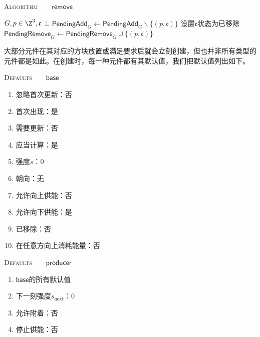 \documentclass[a4,11pt]{aleph-notas}
\begin{document}
\begin{codigo}
\textsc{Algorithm}\ \ \ \ $\mathsf{remove}$
\begin{algorithmic}[1]
    \Require $G,p\in\Z^3,\mathfrak{c}$
    \Ensure $\bot$
        \State $\textsf{PendingAdd}_G\gets\textsf{PendingAdd}_G\backslash\{(p,\mathfrak{c})\}$
    \EndIf
    \State 设置$\mathfrak{c}$状态为已移除
    \State $\textsf{PendingRemove}_G\gets\textsf{PendingRemove}_G\cup\{(p,\mathfrak{c})\}$
    \State \Return
\end{algorithmic}
\end{codigo}

大部分元件在其对应的方块放置或满足要求后就会立刻创建，但也并非所有类型的元件都是如此。在创建时，每一种元件都有其默认值，我们把默认值列出如下。

\begin{codigo}
\textsc{Defaults}\ \ \ \ $\mathsf{base}$
\begin{enumerate}
  \setlength{\itemsep}{1pt}
  \setlength{\parskip}{0pt}
  \setlength{\parsep}{0pt}
    \item 忽略首次更新：否
    \item 首次出现：是
    \item 需要更新：否
    \item 应当计算：是
    \item 强度$s$：$0$
    \item 朝向：无
    \item 允许向上供能：否
    \item 允许向下供能：是
    \item 已移除：否
    \item 在任意方向上消耗能量：否
\end{enumerate}
\end{codigo}

\begin{codigo}
\textsc{Defaults}\ \ \ \ $\mathsf{producer}$
\begin{enumerate}
  \setlength{\itemsep}{1pt}
  \setlength{\parskip}{0pt}
  \setlength{\parsep}{0pt}
    \item $\mathsf{base}$的所有默认值
    \item 下一刻强度$s_{\mathrm{next}}$：$0$
    \item 允许附着：否
    \item 停止供能：否
\end{enumerate}
\end{codigo}
\end{document}

